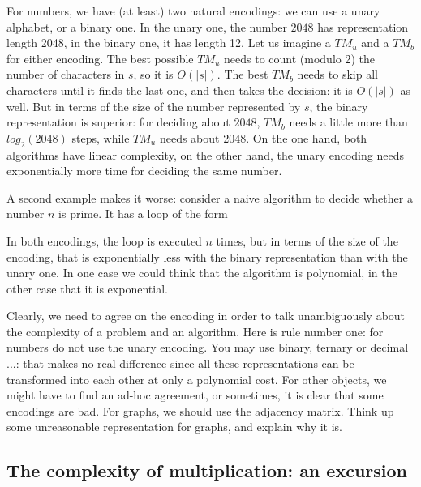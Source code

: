 For numbers, we have (at least) two natural encodings: we can use a
unary alphabet, or a binary one. In the unary one, the number $2048$
has representation length 2048, in the binary one, it has length 12. Let
us imagine a $TM_u$ and a $TM_b$ for either encoding. The best
possible $TM_u$ needs to count (modulo 2) the number of characters in
$s$, so it is $O(|s|)$. The best $TM_b$ needs to skip all characters
until it finds the last one, and then takes the decision: it is
$O(|s|)$ as well. But in terms of the size of the number represented
by $s$, the binary representation is superior: for deciding about
$2048$, $TM_b$ needs a little more than $log_2(2048)$ steps, while
$TM_u$ needs about 2048. On the one hand, both algorithms have linear
complexity, on the other hand, the unary encoding needs exponentially
more time for deciding the same number.

A second example makes it worse: consider a naive algorithm to decide
whether a number $n$ is prime. It has a loop of the form

\begin{algorithmic}
         \EndIf
    \EndWhile
\end{algorithmic}

In both encodings, the loop is executed $n$ times, but in terms of the
size of the encoding, that is exponentially less with the binary
representation than with the unary one. In one case we could think
that the algorithm is polynomial, in the other case that it is
exponential.

Clearly, we need to agree on the encoding in order to talk
unambiguously about the complexity of a problem and an algorithm. Here
is rule number one: for numbers do not use the unary encoding. You may
use binary, ternary or decimal ...: that makes no real difference
since all these representations can be transformed into each other at
only a polynomial cost. For other objects, we might have to find an
ad-hoc agreement, or sometimes, it is clear that some encodings are
bad. For graphs, we should use the adjacency matrix. Think up some
unreasonable representation for graphs, and explain why it is.


\subsection{The complexity of multiplication: an excursion}


